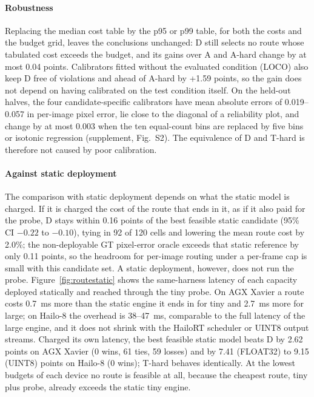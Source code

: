 \documentclass[a4paper,5p]{elsarticle}
\begin{document}
\paragraph{Robustness} Replacing the median cost table by the p95 or p99 table, for both the costs and the budget grid, leaves the conclusions unchanged: D still selects no route whose tabulated cost exceeds the budget, and its gains over A and A-hard change by at most 0.04 points. Calibrators fitted without the evaluated condition (LOCO) also keep D free of violations and ahead of A-hard by +1.59 points, so the gain does not depend on having calibrated on the test condition itself. On the held-out halves, the four candidate-specific calibrators have mean absolute errors of 0.019--0.057 in per-image pixel error, lie close to the diagonal of a reliability plot, and change by at most 0.003 when the ten equal-count bins are replaced by five bins or isotonic regression (supplement, Fig.~S2). The equivalence of D and T-hard is therefore not caused by poor calibration.

\paragraph{Against static deployment} The comparison with static deployment depends on what the static model is charged. If it is charged the cost of the route that ends in it, as if it also paid for the probe, D stays within 0.16 points of the best feasible static candidate (95\% CI $-0.22$ to $-0.10$), tying in 92 of 120 cells and lowering the mean route cost by 2.0\%; the non-deployable GT pixel-error oracle exceeds that static reference by only 0.11 points, so the headroom for per-image routing under a per-frame cap is small with this candidate set. A static deployment, however, does not run the probe. Figure~\ref{fig:routestatic} shows the same-harness latency of each capacity deployed statically and reached through the tiny probe. On AGX Xavier a route costs 0.7~ms more than the static engine it ends in for tiny and 2.7~ms more for large; on Hailo-8 the overhead is 38--47~ms, comparable to the full latency of the large engine, and it does not shrink with the HailoRT scheduler or UINT8 output streams. Charged its own latency, the best feasible static model beats D by 2.62 points on AGX Xavier (0 wins, 61 ties, 59 losses) and by 7.41 (FLOAT32) to 9.15 (UINT8) points on Hailo-8 (0 wins); T-hard behaves identically. At the lowest budgets of each device no route is feasible at all, because the cheapest route, tiny plus probe, already exceeds the static tiny engine.
\end{document}
